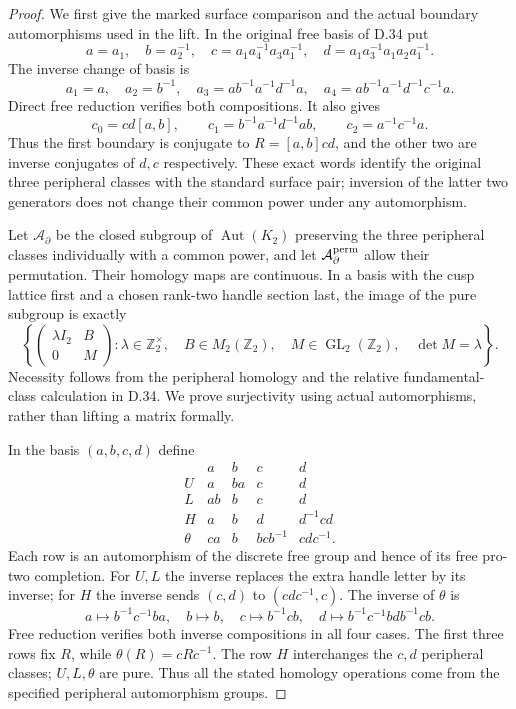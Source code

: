 \begin{proof}
We first give the marked surface comparison and the actual boundary
automorphisms used in the lift. In the original free basis of D.34
put
\[
 a=a_1,\quad b=a_2^{-1},\quad
 c=a_1a_4^{-1}a_3a_1^{-1},\quad
 d=a_1a_3^{-1}a_1a_2a_1^{-1}.
                                                               \tag{D.35.6}
\]
The inverse change of basis is
\[
 a_1=a,\quad a_2=b^{-1},\quad
 a_3=ab^{-1}a^{-1}d^{-1}a,\quad
 a_4=ab^{-1}a^{-1}d^{-1}c^{-1}a.                      \tag{D.35.7}
\]
Direct free reduction verifies both compositions. It also gives
\[
 c_0=cd[a,b],\qquad c_1=b^{-1}a^{-1}d^{-1}ab,
 \qquad c_2=a^{-1}c^{-1}a.                            \tag{D.35.8}
\]
Thus the first boundary is conjugate to $R=[a,b]cd$, and the other
two are inverse conjugates of $d,c$ respectively. These exact words
identify the original three peripheral classes with the standard
surface pair; inversion of the latter two generators does not change
their common power under any automorphism.

Let $\mathcal A_{\partial}$ be the closed subgroup of
$\operatorname{Aut}(K_2)$ preserving the three peripheral classes
individually with a common power, and let
$\mathcal A_{\partial}^{\rm perm}$ allow their permutation.
Their homology maps are continuous. In a basis with the cusp lattice
first and a chosen rank-two handle section last, the image of the
pure subgroup is exactly
\[
 \left\{\begin{pmatrix}\lambda I_2&B\\0&M\end{pmatrix}:
 \lambda\in\mathbb Z_2^\times,\quad B\in M_2(\mathbb Z_2),
 \quad M\in\operatorname{GL}_2(\mathbb Z_2),\quad\det M=\lambda
 \right\}.                                          \tag{D.35.9}
\]
Necessity follows from the peripheral homology and the relative
fundamental-class calculation in D.34. We prove surjectivity using
actual automorphisms, rather than lifting a matrix formally.

In the basis $(a,b,c,d)$ define
\[
 \begin{array}{c|cccc}
 &a&b&c&d\\\hline
 U&a&ba&c&d\\
 L&ab&b&c&d\\
 H&a&b&d&d^{-1}cd\\
 \theta&ca&b&bcb^{-1}&cdc^{-1}.
 \end{array}                                         \tag{D.35.10}
\]
Each row is an automorphism of the discrete free group and hence of
its free pro-two completion. For $U,L$ the inverse replaces the
extra handle letter by its inverse; for $H$ the inverse sends
$(c,d)$ to $(cdc^{-1},c)$. The inverse of $\theta$ is
\[
 a\mapsto b^{-1}c^{-1}ba,\quad b\mapsto b,\quad
 c\mapsto b^{-1}cb,\quad
 d\mapsto b^{-1}c^{-1}bdb^{-1}cb.                      \tag{D.35.11}
\]
Free reduction verifies both inverse compositions in all four cases.
The first three rows fix $R$, while $\theta(R)=cRc^{-1}$.
The row $H$ interchanges the $c,d$ peripheral classes; $U,L,\theta$
are pure. Thus all the stated homology operations come from the
specified peripheral automorphism groups.


\end{proof}
